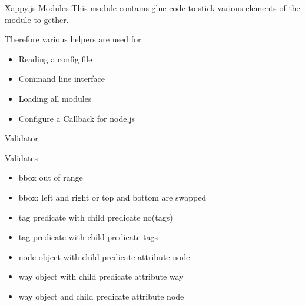 \documentclass{beamer}
\begin{document}

\begin{frame}{Xappy.js Modules}
    This module contains glue code to stick various elements of the module to gether.

    Therefore various helpers are used for:

    \begin{itemize}
        \item Reading a config file
        \item Command line interface
        \item Loading all modules
        \item Configure a Callback for node.js
    \end{itemize}
\end{frame}

\begin{frame}{Validator}

    \begin{block}{Validates}
        \begin{itemize}
            \item bbox out of range
            \item bbox: left and right or top and bottom are swapped
            \item tag predicate with child predicate no(tags)
            \item tag predicate with child predicate tags
            \item node object with child predicate attribute node
            \item way object with child predicate attribute way
            \item way object and child predicate attribute node
        \end{itemize}
    \end{block}

\end{frame}
\end{document}

